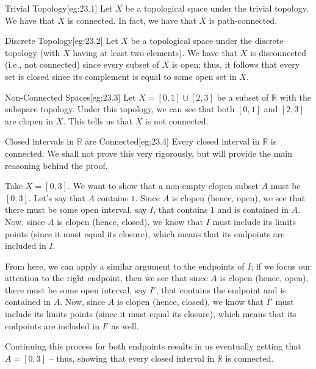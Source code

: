\begin{egBox}{Trivial Topology}[eg:23.1]
    Let \( X \) be a topological space under the trivial topology.
    We have that \( X \) is connected.
    In fact, we have that \( X \) is path-connected.
\end{egBox}

\begin{egBox}{Discrete Topology}[eg:23.2]
    Let \( X \) be a topological space under the discrete topology (with 
    \( X \) having at least two elements).
    We have that \( X \) is disconnected (i.e., not connected) since every 
    subset of \( X \) is open; thus, it follows that every set is closed 
    since its complement is equal to some open set in \( X \).
\end{egBox}

\begin{egBox}{Non-Connected Spaces}[eg:23.3]
    Let \( X = [ 0, 1 ] \cup [ 2, 3 ] \) be a subset of \( \mathbb{R} \) with
    the subspace topology.
    Under this topology, we can see that both \( [ 0, 1 ] \) and 
    \( [ 2, 3 ] \) are clopen in \( X \).
    This tells us that \( X \) is not connected.
\end{egBox}

\begin{egBox}{Closed intervals in \( \mathbb{R} \) are Connected}[eg:23.4]
    Every closed interval in \( \mathbb{R} \) is connected.
    We shall not prove this very rigorously, but will provide the main 
    reasoning behind the proof.

    \baseSkip
    Take \( X = [ 0, 3 ] \).
    We want to show that a non-empty clopen subset \( A \) must be 
    \( [ 0, 3 ] \).
    Let's say that \( A \) contains \( 1 \).
    Since \( A \) is clopen (hence, open), we see that there must be some open 
    interval, say \( I \), that contains \( 1 \) and is contained in \( A \).
    Now, since \( A \) is clopen (hence, closed), we know that \( I \) must 
    include its limits points (since it must equal its closure), which means
    that its endpoints are included in \( I \).

    \baseSkip

    From here, we can apply a similar argument to the endpoints of \( I \); if 
    we focus our attention to the right endpoint, then we see that 
    since \( A \) is clopen (hence, open), there must be some open 
    interval, say \( I' \), that contains the endpoint and is contained in 
    \( A \).
    Now, since \( A \) is clopen (hence, closed), we know that \( I' \) must 
    include its limits points (since it must equal its closure), which means
    that its endpoints are included in \( I' \) as well.

    \baseSkip

    Continuing this process for both endpoints results in us eventually getting 
    that \( A = [ 0, 3 ] \) -- thus, showing that every closed interval in
    \( \mathbb{R} \) is connected.
\end{egBox}

